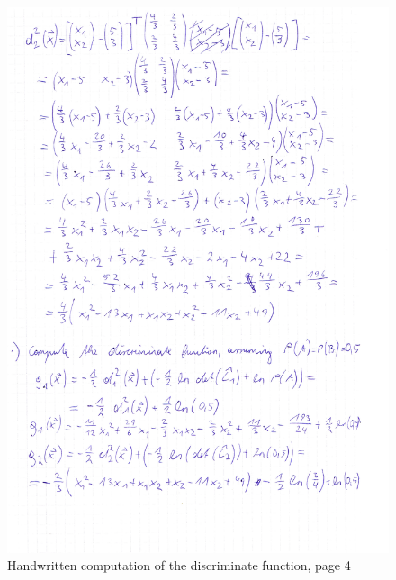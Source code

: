 \documentclass[subfigure,epsfig,fleqn,amssmb,float,caption,ausarbeitung]{scrartcl}
\begin{document}
\begin{figure}
\includegraphics[width=14cm]{img/discriminantFunction4.jpg}
	\caption{Handwritten computation of the discriminate function, page 4}
	\label{fig:hws4}
\end{figure}
\end{document}
